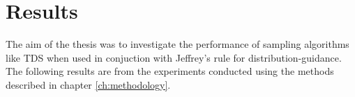 \chapter{Results}
The aim of the thesis was to investigate the performance of sampling algorithms like TDS when used in conjuction with Jeffrey's rule for distribution-guidance. The following results are from the experiments conducted using the methods described in chapter \ref{ch:methodology}.   

